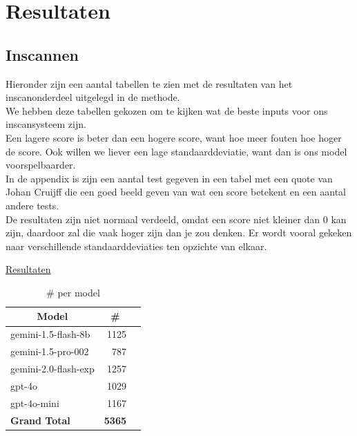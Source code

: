 \documentclass[12pt]{article}
\begin{document}
\section{Resultaten}
\subsection{Inscannen}
\noindent Hieronder zijn een aantal tabellen te zien met de resultaten van het inscanonderdeel uitgelegd in de methode. \\
We hebben deze tabellen gekozen om te kijken wat de beste inputs voor ons inscansysteem zijn. \\
Een lagere score is beter dan een hogere score, want hoe meer fouten hoe hoger de score. Ook willen we liever een lage standaarddeviatie, want dan is ons model voorspelbaarder. \\
In de appendix is zijn een aantal test gegeven in een tabel met een quote van Johan Cruijff die een goed beeld geven van wat een score betekent en een aantal andere tests.\\
De resultaten zijn niet normaal verdeeld, omdat een score niet kleiner dan 0 kan zijn, daardoor zal die vaak hoger zijn dan je zou denken. Er wordt vooral gekeken naar verschillende standaarddeviaties ten opzichte van elkaar. 

\href{https://docs.google.com/spreadsheets/d/1wbHiG81i-UJ18s6gP3i_WtsPD-FBQTqg7AwNjN8Rm2g}{Resultaten}

\noindent\begin{table}[H]
\caption{\# per model}
\label{fig:count-model}
\begin{tabularx}{\textwidth}{X *2{r}}
    \toprule
    \multicolumn{1}{c}{\textbf{Model}} & \multicolumn{1}{c}{\textbf{\#}} \\  %
    \midrule
    gemini-1.5-flash-8b & 1125 \\
    gemini-1.5-pro-002 & 787 \\
    gemini-2.0-flash-exp & 1257 \\
    gpt-4o & 1029 \\
    gpt-4o-mini & 1167 \\
    \midrule
    \textbf{Grand Total} & \textbf{5365} \\
    \bottomrule
    
\end{tabularx}%
\end{table}
\end{document}
